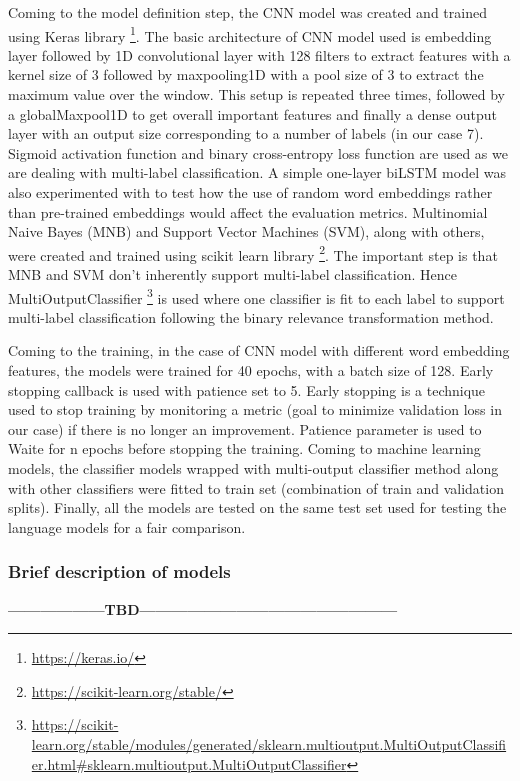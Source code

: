 Coming to the model definition step, the CNN model was created and trained using Keras library \footnote{\url{https://keras.io/}}. The basic architecture of CNN model used is embedding layer followed by 1D convolutional layer with 128 filters to extract features with a kernel size of 3 followed by maxpooling1D with a pool size of 3 to extract the maximum value over the window. This setup is repeated three times, followed by a globalMaxpool1D to get overall important features and finally a dense output layer with an output size corresponding to a number of labels (in our case 7). Sigmoid activation function and binary cross-entropy loss function are used as we are dealing with multi-label classification. A simple one-layer biLSTM model was also experimented with to test how the use of random word embeddings rather than pre-trained embeddings would affect the evaluation metrics. Multinomial Naive Bayes (MNB) and Support Vector Machines (SVM), along with others, were created and trained using scikit learn library \footnote{\url{https://scikit-learn.org/stable/}}. The important step is that MNB and SVM don't inherently support multi-label classification. Hence MultiOutputClassifier \footnote{\url{https://scikit-learn.org/stable/modules/generated/sklearn.multioutput.MultiOutputClassifier.html#sklearn.multioutput.MultiOutputClassifier}} is used where one classifier is fit to each label to support multi-label classification following the binary relevance transformation method.

Coming to the training, in the case of CNN model with different word embedding features, the models were trained for 40 epochs, with a batch size of 128. Early stopping callback is used with patience set to 5.
Early stopping is a technique used to stop training by monitoring a metric (goal to minimize validation loss in our case) if there is no longer an improvement. Patience parameter is used to Waite for n epochs before stopping the training. Coming to machine learning models, the classifier models wrapped with multi-output classifier method along with other classifiers were fitted to train set (combination of train and validation splits). Finally, all the models are tested on the same test set used for testing the language models for a fair comparison.

\subsubsection{Brief description of models}
\textbf{------------------TBD------------------------------------------------}


